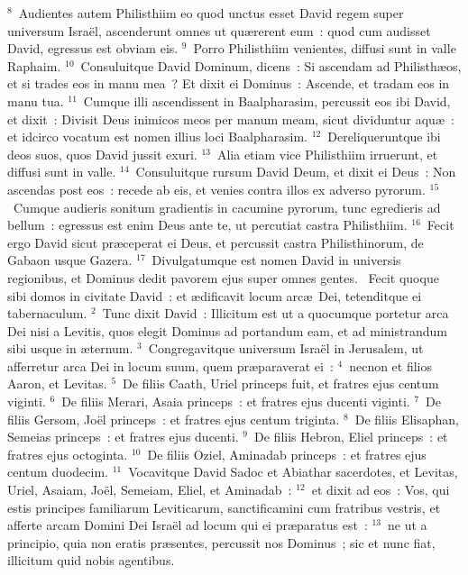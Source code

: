 ${}^{8}$~Audientes autem Philisthiim eo quod unctus esset David regem super universum Isra\"el, ascenderunt omnes ut qu\ae rerent eum~: quod cum audisset David, egressus est obviam eis.
${}^{9}$~Porro Philisthiim venientes, diffusi sunt in valle Raphaim.
${}^{10}$~Consuluitque David Dominum, dicens~: Si ascendam ad Philisth\ae os, et si trades eos in manu mea~? Et dixit ei Dominus~: Ascende, et tradam eos in manu tua.
${}^{11}$~Cumque illi ascendissent in Baalpharasim, percussit eos ibi David, et dixit~: Divisit Deus inimicos meos per manum meam, sicut dividuntur aqu\ae~: et idcirco vocatum est nomen illius loci Baalpharasim.
${}^{12}$~Dereliqueruntque ibi deos suos, quos David jussit exuri.
${}^{13}$~Alia etiam vice Philisthiim irruerunt, et diffusi sunt in valle.
${}^{14}$~Consuluitque rursum David Deum, et dixit ei Deus~: Non ascendas post eos~: recede ab eis, et venies contra illos ex adverso pyrorum.
${}^{15}$~Cumque audieris sonitum gradientis in cacumine pyrorum, tunc egredieris ad bellum~: egressus est enim Deus ante te, ut percutiat castra Philisthiim.
${}^{16}$~Fecit ergo David sicut pr\ae ceperat ei Deus, et percussit castra Philisthinorum, de Gabaon usque Gazera.
${}^{17}$~Divulgatumque est nomen David in universis regionibus, et Dominus dedit pavorem ejus super omnes gentes.
~Fecit quoque sibi domos in civitate David~: et \ae dificavit locum arc\ae\ Dei, tetenditque ei tabernaculum.
${}^{2}$~Tunc dixit David~: Illicitum est ut a quocumque portetur arca Dei nisi a Levitis, quos elegit Dominus ad portandum eam, et ad ministrandum sibi usque in \ae ternum.
${}^{3}$~Congregavitque universum Isra\"el in Jerusalem, ut afferretur arca Dei in locum suum, quem pr\ae paraverat ei~:
${}^{4}$~necnon et filios Aaron, et Levitas.
${}^{5}$~De filiis Caath, Uriel princeps fuit, et fratres ejus centum viginti.
${}^{6}$~De filiis Merari, Asaia princeps~: et fratres ejus ducenti viginti.
${}^{7}$~De filiis Gersom, Jo\"el princeps~: et fratres ejus centum triginta.
${}^{8}$~De filiis Elisaphan, Semeias princeps~: et fratres ejus ducenti.
${}^{9}$~De filiis Hebron, Eliel princeps~: et fratres ejus octoginta.
${}^{10}$~De filiis Oziel, Aminadab princeps~: et fratres ejus centum duodecim.
${}^{11}$~Vocavitque David Sadoc et Abiathar sacerdotes, et Levitas, Uriel, Asaiam, Jo\"el, Semeiam, Eliel, et Aminadab~:
${}^{12}$~et dixit ad eos~: Vos, qui estis principes familiarum Leviticarum, sanctificamini cum fratribus vestris, et afferte arcam Domini Dei Isra\"el ad locum qui ei pr\ae paratus est~:
${}^{13}$~ne ut a principio, quia non eratis pr\ae sentes, percussit nos Dominus~; sic et nunc fiat, illicitum quid nobis agentibus.
